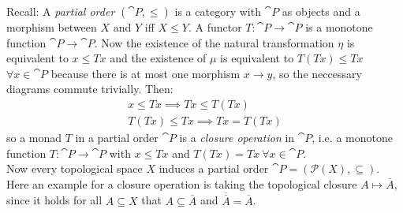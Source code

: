 \begin{example}
Recall: A \textit{partial order} $(\cat{P},\le)$ is a category with $\cat{P}$ as objects and 
a morphism between $X$ and $Y$ iff $X \le Y$.
A functor $T\colon \cat{P} \to \cat{P}$ is a monotone function $\cat{P}\to \cat{P}$.
Now the existence of the natural transformation $\eta$ is equivalent to
$x \le Tx$
and the existence of $\mu$ is equivalent to
$T(Tx) \le Tx$ $\forall x \in \cat{P}$
because there is at most one morphism $x \to y$, so the neccessary diagrams commute trivially.
Then:
\begin{align*}
    x \le Tx \implies Tx \le T(Tx) \\
    T(Tx) \le Tx \implies Tx = T(Tx)
\end{align*}
so a monad $T$ in a partial order $\cat{P}$ is a \textit{closure operation} in $\cat{P}$, i.e. 
a monotone function $T \colon \cat{P} \to \cat{P}$ 
with $x \le Tx$ and $T(Tx)=Tx \ \forall x \in \cat{P}.$ \\
Now every topological space $X$ induces a partial order $\cat{P} = (\mathscr{P}(X),\subseteq)$.
Here an example for a closure operation is taking the topological closure $A \mapsto \overline{A}$,
since it holds for all $A \subseteq X$ that $A \subseteq \overline{A}$ and
$\overline{\overline{A}} = \overline{A}$.

\end{example}

